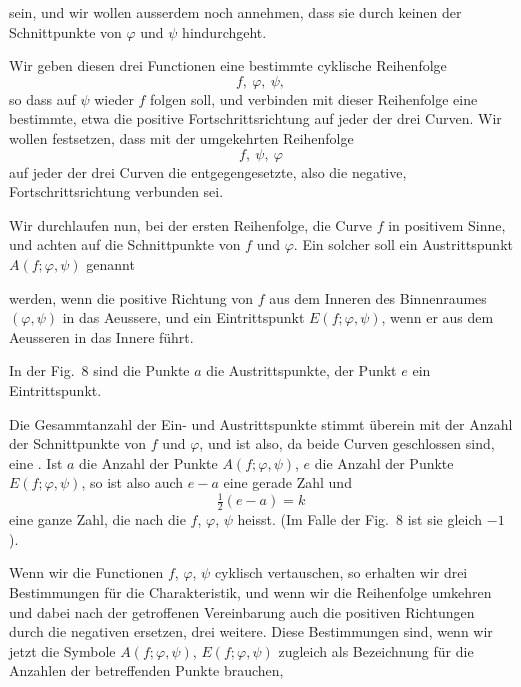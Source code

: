 sein, und wir wollen ausserdem noch annehmen, dass sie durch
keinen der Schnittpunkte von $\varphi$ und $\psi$ hindurchgeht.

Wir geben diesen drei Functionen eine bestimmte cyklische
Reihenfolge
\[
f,\ \varphi,\ \psi,
\]
so dass auf $\psi$ wieder $f$ folgen soll, und verbinden mit dieser
Reihenfolge eine bestimmte, etwa die positive Fortschrittsrichtung
auf jeder der drei Curven. Wir wollen festsetzen, dass mit der
umgekehrten Reihenfolge
\[
f,\ \psi,\ \varphi
\]
auf jeder der drei Curven die entgegengesetzte, also die negative,
Fortschrittsrichtung verbunden sei.

Wir durchlaufen nun, bei der ersten Reihenfolge, die Curve
$f$ in positivem Sinne, und achten auf die Schnittpunkte von $f$
und $\varphi$. Ein solcher soll ein Austrittspunkt $A(f; \varphi, \psi)$ genannt


werden, wenn die positive Richtung von $f$ aus dem Inneren des
Binnenraumes $(\varphi, \psi)$ in das Aeussere, und ein Eintrittspunkt
$E(f; \varphi, \psi)$, wenn er aus dem Aeusseren in das Innere führt.

In der Fig.~8 sind die Punkte $a$ die Austrittspunkte, der Punkt
$e$ ein Eintrittspunkt.

Die Gesammtanzahl der Ein- und Austrittspunkte stimmt überein
mit der Anzahl der Schnittpunkte von $f$ und $\varphi$, und ist also, da
beide Curven geschlossen sind, eine . Ist $a$ die Anzahl
der Punkte $A(f; \varphi, \psi)$, $e$ die Anzahl der Punkte $E(f; \varphi, \psi)$, so
ist also auch $e - a$ eine gerade Zahl und
\[
\tfrac{1}{2}(e - a) = k
\]
eine ganze Zahl, die nach  die  $f$, $\varphi$, $\psi$ heisst. (Im Falle der Fig.~8
ist sie gleich $-1$).

Wenn wir die Functionen $f$, $\varphi$, $\psi$ cyklisch vertauschen, so
erhalten wir drei Bestimmungen für die Charakteristik, und wenn
wir die Reihenfolge umkehren und dabei nach der getroffenen
Vereinbarung auch die positiven Richtungen durch die negativen
ersetzen, drei weitere. Diese Bestimmungen sind, wenn wir jetzt
die Symbole $A(f; \varphi, \psi)$, $E(f; \varphi, \psi)$ zugleich als Bezeichnung
für die Anzahlen der betreffenden Punkte brauchen,
